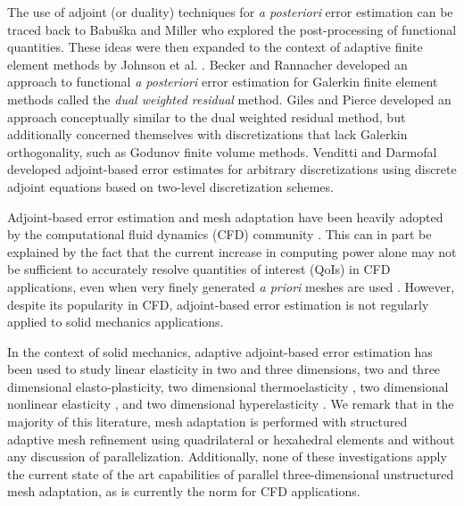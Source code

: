 The use of adjoint (or duality) techniques for \emph{a posteriori} error
estimation can be traced back to Babu\v{s}ka and Miller
\cite{babuska1984post1, babuska1984post2, babuska1984post3} who explored the
post-processing of functional quantities. These ideas were then expanded to the
context of adaptive finite element methods by Johnson et al.
\cite{eriksson1996computational}. Becker and Rannacher \cite{becker2001optimal}
developed an approach to functional \emph{a posteriori} error estimation for
Galerkin finite element methods called the \emph{dual weighted residual}
method. Giles and Pierce \cite{giles2003adjoint} developed an approach
conceptually similar to the dual weighted residual method, but additionally
concerned themselves with discretizations that lack Galerkin orthogonality,
such as Godunov finite volume methods. Venditti and Darmofal
\cite{venditti2000adjoint, venditti2002adjoint, venditti2003adjoint} developed
adjoint-based error estimates for arbitrary discretizations using discrete
adjoint equations based on two-level discretization schemes.

Adjoint-based error estimation and mesh adaptation have been heavily adopted
by the computational fluid dynamics (CFD) community \cite{fidkowski2011review}.
This can in part be explained by the fact that the current increase in
computing power alone may not be sufficient to accurately resolve
quantities of interest (QoIs) in CFD applications, even when very finely
generated \emph{a priori} meshes are used \cite{fidkowski2011review}. However,
despite its popularity in CFD, adjoint-based error estimation is not regularly
applied to solid mechanics applications.

In the context of solid mechanics, adaptive adjoint-based error estimation
has been used to study linear elasticity in two
\cite{rannacher1997feed, stein2007error, gonzalez2014mesh} and three
\cite{ghorashi2014goal} dimensions, two
\cite{rannacher1998posteriori, rannacher1999posteriori} and three
\cite{ghorashi2017goal} dimensional elasto-plasticity, two dimensional
thermoelasticity \cite{rabizadeh2015adaptive}, two dimensional
nonlinear elasticity \cite{larsson2002strategies}, and two dimensional
hyperelasticity \cite{whiteley2014error}. We remark that in the majority of
this literature, mesh adaptation is performed with structured adaptive mesh
refinement using quadrilateral or hexahedral elements and without any
discussion of parallelization. Additionally, none of these investigations
apply the current state of the art capabilities of parallel three-dimensional
unstructured mesh adaptation, as is currently the norm for CFD
applications.


